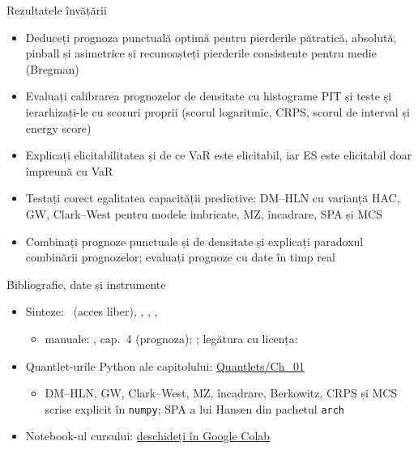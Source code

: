 \begin{frame}{Rezultatele învățării}
\itemsize{\small}
\begin{itemize}
    \item Deduceți prognoza punctuală optimă pentru pierderile pătratică, absolută, pinball și asimetrice și recunoașteți pierderile consistente pentru medie (Bregman)
    \item Evaluați calibrarea prognozelor de densitate cu histograme PIT și teste și ierarhizați-le cu scoruri proprii (scorul logaritmic, CRPS, scorul de interval și energy score)
    \item Explicați elicitabilitatea și de ce VaR este elicitabil, iar ES este elicitabil doar împreună cu VaR
    \item Testați corect egalitatea capacității predictive: DM--HLN cu varianță HAC, GW, Clark--West pentru modele imbricate, MZ, încadrare, SPA și MCS
    \item Combinați prognoze punctuale și de densitate și explicați paradoxul combinării prognozelor; evaluați prognoze cu date în timp real
\end{itemize}
\end{frame}

\begin{frame}{Bibliografie, date și instrumente}
\itemsize{\small}
\begin{itemize}
    \item Sinteze: \ (acces liber), , , , 
    \begin{itemize}
        \item manuale: , cap.~4 (prognoza); ; legătura cu licența: 
    \end{itemize}
    \item Quantlet-urile Python ale capitolului: \href{https://github.com/danpele/Advanced-Time-Series/tree/main/Quantlets/Ch_01}{Quantlets/Ch\_01}
    \begin{itemize}
        \item DM--HLN, GW, Clark--West, MZ, încadrare, Berkowitz, CRPS și MCS scrise explicit în \texttt{numpy}; SPA a lui Hansen din pachetul \texttt{arch}
    \end{itemize}
    \item Notebook-ul cursului: \href{\colaburl{notebooks/EN/chapter1_lecture_notebook.ipynb}}{deschideți în Google Colab}
\end{itemize}
\end{frame}

